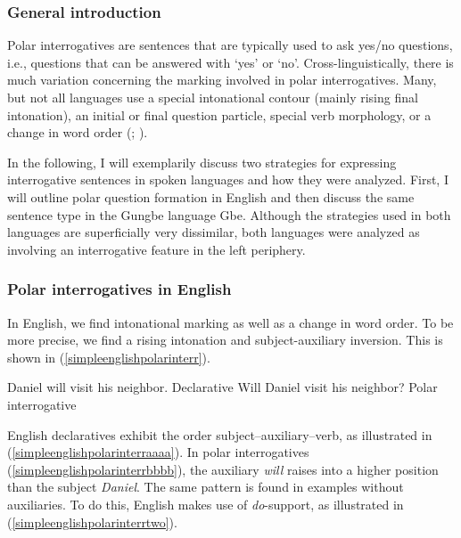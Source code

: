 \subsubsection{General introduction}
Polar interrogatives are sentences that are typically used to ask yes/no questions, i.e., questions that can be answered with `yes' or `no'. Cross-linguistically, there is much variation concerning the marking involved in polar interrogatives. Many, but not all languages use a special intonational contour (mainly rising final intonation), an initial or final question particle, special verb morphology, or a change in word order (\citealt[181--182]{sadock1985speech}; \citealt{dryer2013questions}). 

In the following, I will exemplarily discuss two strategies for expressing interrogative sentences in spoken languages and how they were analyzed. First, I will outline polar question formation in English and then discuss the same sentence type in the Gungbe language Gbe. Although the strategies used in both languages are superficially very dissimilar, both languages were analyzed as involving an interrogative feature in the left periphery.

\subsubsection{Polar interrogatives in English}

In English, we find intonational marking as well as a change in word order. To be more precise, we find a rising intonation and subject-auxiliary inversion. This is shown in (\ref{simpleenglishpolarinterr}).

\begin{exe}
\ex\label{simpleenglishpolarinterr}\begin{xlist}
\ex Daniel will visit his neighbor. \hfill Declarative\label{simpleenglishpolarinterraaaa}
\ex Will Daniel visit his neighbor? \hfill Polar interrogative\label{simpleenglishpolarinterrbbbb}
\end{xlist}
\end{exe} 

\noindent English declaratives exhibit the order subject--auxiliary--verb, as illustrated in (\ref{simpleenglishpolarinterraaaa}). In polar interrogatives (\ref{simpleenglishpolarinterrbbbb}), the auxiliary \textit{will} raises into a higher position than the subject \textit{Daniel}. The same pattern is found in examples without auxiliaries. To do this, English makes use of \textit{do}-support, as illustrated in (\ref{simpleenglishpolarinterrtwo}).

